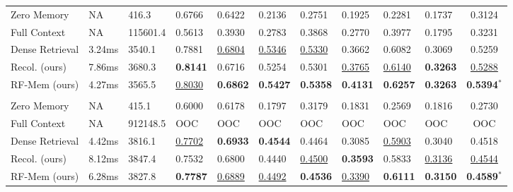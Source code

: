 \begin{table}[ht]
\begin{tabular}{p{2.0cm}|M{1.0cm}|M{1.15cm}|M{1.2cm}M{1.4cm}M{0.9cm}M{1.2cm}M{1.3cm}M{1.0cm}M{1.0cm}|>{}c}
    Zero Memory & NA &416.3 & 0.6766&0.6422&0.2136&0.2751&0.1925&0.2281&0.1737&0.3124 \\
    Full Context & NA & 115601.4& 0.5613 &0.3930 &0.2783 &0.3868 &0.2770 &0.3977 &0.1795 &0.3231 \\
    Dense Retrieval & 3.24ms & 3540.1 & 0.7881 & \underline{0.6804} & \underline{0.5346} & \underline{0.5330} & 0.3662 & 0.6082 & 0.3069 & 0.5259 \\
    Recol. (ours) & 7.86ms &3680.3& \textbf{0.8141} & 0.6716 & 0.5254 & 0.5301 & \underline{0.3765} & \underline{0.6140} & \textbf{0.3263} & \underline{0.5288} \\
    RF-Mem (ours)&4.27ms &3565.5& \underline{0.8030} & \textbf{0.6862} & \textbf{0.5427} &\textbf{0.5358} & \textbf{0.4131} & \textbf{0.6257} &\textbf{ 0.3263} & \textbf{0.5394$^*$}\\
    \midrule
     \\
    Zero Memory & NA & 415.1& 0.6000&0.6178&0.1797&0.3179&0.1831&0.2569&0.1816&0.2730 \\
    Full Context & NA &912148.5 &OOC &OOC &OOC &OOC &OOC &OOC &OOC &OOC \\
    Dense Retrieval& 4.42ms & 3816.1& \underline{0.7702} & \textbf{0.6933} & \textbf{0.4544} & 0.4464 & 0.3085 & \underline{0.5903} & 0.3040 & 0.4518 \\
    Recol. (ours) & 8.12ms&3847.4 & {0.7532} & 0.6800 & 0.4440 & \underline{0.4500} & \textbf{0.3593} & 0.5833 & \underline{0.3136} & \underline{0.4544} \\
    RF-Mem (ours)& 6.28ms & 3827.8& \textbf{0.7787} & \underline{0.6889} & \underline{0.4492} & \textbf{0.4536} & \underline{0.3390} & \textbf{0.6111} & \textbf{0.3150} & \textbf{0.4589$^*$} \\
    \bottomrule
    \end{tabular}
\end{table}


